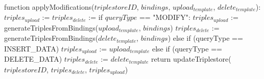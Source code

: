 function applyModifications($triplestoreID$, $bindings$, $upload_{template}$, $delete_{template}$):
    $triples_{upload}$ := {}
    $triples_{delete}$ := {}
    if $queryType$ == "MODIFY":
        $triples_{upload}$ := generateTriplesFromBindings($upload_{template}$, $bindings$) 
    $triples_{delete}$ := generateTriplesFromBindings($delete_{template}$, $bindings$)
    else if (queryType == INSERT_DATA)
        $triples_{upload}$ := $upload_{template}$
    else if (queryType == DELETE_DATA)
        $triples_{delete}$ := $delete_{template}$
    return updateTriplestore($triplestoreID$, $triples_{delete}$, $triples_{upload}$)


